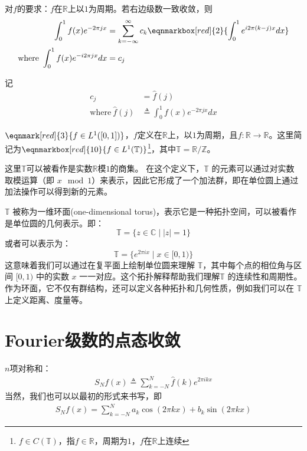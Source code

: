 对$f$的要求：$f$在$\mathbb{R}$上以$1$为周期。若右边级数一致收敛，则
\begin{align*}
    \int_0^1 f(x) e^{-2\pi jx} &= \sum\limits_{k=-\infty}^{\infty} c_k \eqnmarkbox[red]{2}{\int_0^1 e^{i2\pi(k-j)x}dx} \\
    \text{where}\ \int_0^1 f(x)e^{-i2\pi jx}dx &= c_j
\end{align*}

记
\begin{align*}
    c_j &= \hat{f}(j) \\
    \text{where}\ \hat{f}(j) &\triangleq \int_0^1 f(x) e^{-2\pi jx}dx 
\end{align*}

\vspace{1em}
$\eqnmark[red]{3}{f\in L^1([0,1])}$，$f$定义在$\mathbb{R}$上，以$1$为周期，且$f:\mathbb{R}\to\mathbb{R}$。这里简记为$\eqnmarkbox[red]{10}{f\in L^1(\mathbb{T})}$\footnote{$f\in C(\mathbb{T})$，指$f\in\mathbb{R}$，周期为$1$，$f$在$\mathbb{R}$上连续}，其中$\mathbb{T} = \mathbb{R}/\mathbb{Z}$。
\annotate[yshift=-0.5em]{below,left}{10}{$f:\mathbb{R}\to\mathbb{R}$，且$f$的周期为$1$，$f\in L^1[0,1)$。若换成$L^p$亦如此。}

这里$\mathbb{T}$可以被看作是实数$\mathbb{R}$模$1$的商集。 在这个定义下，\(\mathbb{T}\) 的元素可以通过对实数取模运算（即 \( x \mod 1 \)）来表示，因此它形成了一个加法群，即在单位圆上通过加法操作可以得到新的元素。

\(\mathbb{T}\) 被称为一维环面(one-dimensional torus)，表示它是一种拓扑空间，可以被看作是单位圆的几何表示。即：
  \[
  \mathbb{T} = \{ z \in \mathbb{C} \mid |z| = 1 \}
  \]
  或者可以表示为：
  \[
  \mathbb{T} = \{ e^{2\pi i x} \mid x \in [0,1) \}
  \]
  这意味着我们可以通过在复平面上绘制单位圆来理解 \(\mathbb{T}\)，其中每个点的相位角与区间 \([0,1)\) 中的实数 \(x\) 一一对应。这个拓扑解释帮助我们理解\(\mathbb{T}\) 的连续性和周期性。作为环面，它不仅有群结构，还可以定义各种拓扑和几何性质，例如我们可以在 \(\mathbb{T}\) 上定义距离、度量等。

\section{Fourier级数的点态收敛}
$n$项对称和：
\begin{align*}
    S_Nf(x) \triangleq \sum\limits_{k=-N}^{N} \hat{f}(k) e^{2\pi ikx}
\end{align*}
当然，我们也可以以最初的形式来书写，即
\begin{align*}
    S_N f(x) = \sum\limits_{k=-N}^{N} a_k \cos (2\pi kx) + b_k \sin (2\pi kx)
\end{align*}

